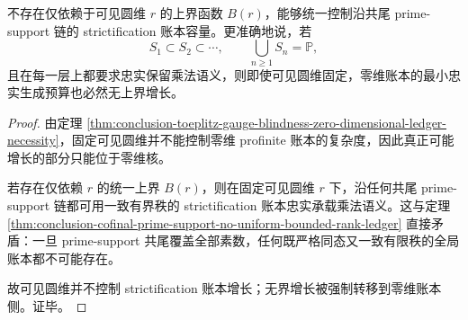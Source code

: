 \begin{corollary}\label{cor:conclusion-visible-circle-dimension-does-not-control-ledger-growth}
不存在仅依赖于可见圆维 \(r\) 的上界函数 \(B(r)\)，能够统一控制沿共尾 prime-support 链的 strictification 账本容量。更准确地说，若
\[
S_1\subset S_2\subset\cdots,
\qquad
\bigcup_{n\ge 1}S_n=\mathbb P,
\]
且在每一层上都要求忠实保留乘法语义，则即使可见圆维固定，零维账本的最小忠实生成预算也必然无上界增长。
\end{corollary}
\begin{proof}
由定理 \ref{thm:conclusion-toeplitz-gauge-blindness-zero-dimensional-ledger-necessity}，固定可见圆维并不能控制零维 profinite 账本的复杂度，因此真正可能增长的部分只能位于零维核。

若存在仅依赖 \(r\) 的统一上界 \(B(r)\)，则在固定可见圆维 \(r\) 下，沿任何共尾 prime-support 链都可用一致有界秩的 strictification 账本忠实承载乘法语义。这与定理 \ref{thm:conclusion-cofinal-prime-support-no-uniform-bounded-rank-ledger} 直接矛盾：一旦 prime-support 共尾覆盖全部素数，任何既严格同态又一致有限秩的全局账本都不可能存在。

故可见圆维并不控制 strictification 账本增长；无界增长被强制转移到零维账本侧。证毕。
\end{proof}

